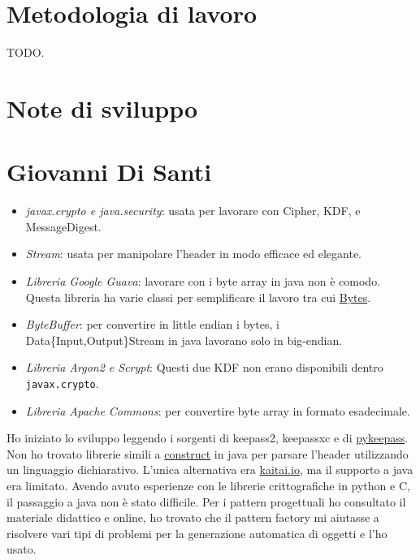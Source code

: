 \documentclass[a4paper,12pt]{report}
\begin{document}
\section{Metodologia di lavoro}

TODO.

\section{Note di sviluppo}

\section*{Giovanni Di Santi}

\begin{itemize}
  \item \textit{javax.crypto e java.security}: usata per lavorare con Cipher, KDF, e MessageDigest.
  \item \textit{Stream}: usata per manipolare l'header in modo efficace ed elegante.
  \item \textit{Libreria Google Guava}: lavorare con i byte array in java non è comodo. Questa libreria ha varie classi per semplificare
    il lavoro tra cui \href{https://guava.dev/releases/19.0/api/docs/com/google/common/primitives/Bytes.html}{Bytes}.
  \item \textit{ByteBuffer}: per convertire in little endian i bytes, i Data\{Input,Output\}Stream in java lavorano solo in big-endian.
  \item \textit{Libreria Argon2 e Scrypt}: Questi due KDF non erano disponibili dentro \texttt{javax.crypto}.
  \item \textit{Libreria Apache Commons}: per convertire byte array in formato esadecimale.
\end{itemize}

Ho iniziato lo sviluppo leggendo i sorgenti di keepass2, keepassxc e di \href{https://github.com/libkeepass/pykeepass}{pykeepass}.
Non ho trovato librerie simili a \href{https://construct.readthedocs.io/en/latest/index.html}{construct} in
java per parsare l'header utilizzando un linguaggio dichiarativo. L'unica alternativa
era \href{http://kaitai.io/}{kaitai.io}, ma il supporto a java era limitato.
Avendo avuto esperienze con le librerie crittografiche in python e C,
il passaggio a java non è stato difficile.
Per i pattern progettuali ho consultato il materiale didattico e online, ho trovato
che il pattern factory mi aiutasse a risolvere vari tipi di problemi per la generazione
automatica di oggetti e l'ho usato.
\end{document}
